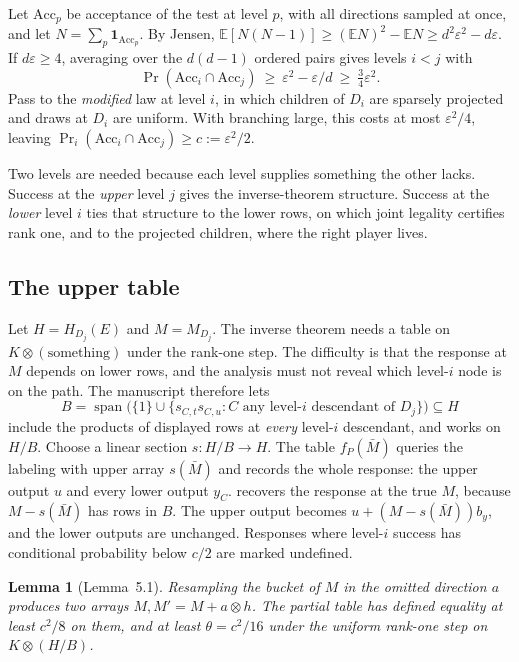\documentclass[11pt]{article}
\newtheorem{lemma}[theorem]{Lemma}
\theoremstyle{definition}
\theoremstyle{remark}
\newcommand{\E}{\mathbb E}
\newcommand{\eps}{\varepsilon}
\DeclareMathOperator{\Span}{span}
\newcommand{\one}{\mathbf 1}
\begin{document}
Let $\mathrm{Acc}_p$ be acceptance of the test at level $p$, with all
directions sampled at once, and let $N=\sum_p\one_{\mathrm{Acc}_p}$. By
Jensen, $\E[N(N-1)]\ge(\E N)^2-\E N\ge d^2\eps^2-d\eps$. If $d\eps\ge4$,
averaging over the $d(d-1)$ ordered pairs gives levels $i<j$ with
\[
 \Pr(\mathrm{Acc}_i\cap\mathrm{Acc}_j)\ \ge\ \eps^2-\eps/d\ \ge\ \tfrac34\eps^2 .
\]
Pass to the \emph{modified} law at level $i$, in which children of $D_i$ are
sparsely projected and draws at $D_i$ are uniform. With branching large, this
costs at most $\eps^2/4$, leaving $\Pr_i(\mathrm{Acc}_i\cap\mathrm{Acc}_j)\ge
c:=\eps^2/2$.

Two levels are needed because each level supplies something the other lacks.
Success at the \emph{upper} level $j$ gives the inverse-theorem structure.
Success at the \emph{lower} level $i$ ties that structure to the lower rows,
on which joint legality certifies rank one, and to the projected children,
where the right player lives.

\subsection{The upper table}

Let $H=H_{D_j}(E)$ and $M=M_{D_j}$. The inverse theorem needs a table on
$K\otimes(\text{something})$ under the rank-one step. The difficulty is that
the response at $M$ depends on lower rows, and the analysis must not reveal
which level-$i$ node is on the path. The manuscript therefore lets
\[
 B=\Span\bigl(\{1\}\cup\{s_{C,t}s_{C,u}: C\text{ any level-$i$ descendant of
 }D_j\}\bigr)\subseteq H
\]
include the products of displayed rows at \emph{every} level-$i$ descendant, and
works on $H/B$. Choose a linear section $s:H/B\to H$. The table
$f_P(\bar M)$ queries the labeling with upper array $s(\bar M)$ and records the
whole response: the upper output $u$ and every lower output $y_C$.
 recovers the response at the true $M$, because
$M-s(\bar M)$ has rows in $B$. The upper output becomes $u+(M-s(\bar M))b_y$,
and the lower outputs are unchanged. Responses where level-$i$ success has
conditional probability below $c/2$ are marked undefined.

\begin{lemma}[Lemma~5.1]
Resampling the bucket of $M$ in the omitted direction $a$ produces two arrays
$M,M'=M+a\otimes h$. The partial table has defined equality at least $c^2/8$
on them, and at least $\theta=c^2/16$ under the uniform rank-one step on
$K\otimes(H/B)$.
\end{lemma}
\end{document}
